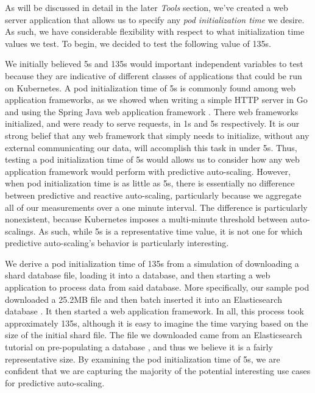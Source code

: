 As will be discussed in detail in the later \textit{Tools} section, we've created a web
server application that allows us to specify any \textit{pod
initialization time} we desire. As such, we have considerable flexibility with
respect to what initialization time values we test. To begin, we decided to test the
following value of 135s.

We initially believed 5s and 135s would important independent variables to test because they
are indicative of different classes of applications that could be run on
Kubernetes. A pod initialization time of 5s is commonly found among web
application frameworks, as we showed when writing a simple HTTP server in Go and
using the Spring Java web application framework \cite{spring}. There web
frameworks initialized, and were ready to serve requests, in 1s and 5s
respectively. It is our strong belief that any web framework that simply
needs to initialize, without any external communicating our data, will
accomplish this task in under 5s. Thus, testing a pod initialization time of 5s
would allows us to consider how any web application framework would perform with
predictive auto-scaling. However, when pod initialization time is as little as
5s, there is essentially no difference between predictive and reactive
auto-scaling, particularly because we aggregate all of our measurements over a
one minute interval. The difference is particularly nonexistent, because
Kubernetes imposes a multi-minute threshold between auto-scalings.
As such, while 5s is a representative time value, it is not
one for which predictive auto-scaling's behavior is particularly interesting.

We derive a pod initialization time of 135s from a simulation of downloading a
shard database file, loading it into a database, and then starting a web
application to process data from said database. More specifically, our sample
pod downloaded a 25.2MB file and then batch inserted it into an Elasticsearch
database \cite{elasticsearch}. It then started a web application framework. In
all, this process took approximately 135s, although it is easy to imagine the
time varying based on the size of the initial shard file. The file we downloaded
came from an Elasticsearch tutorial on pre-populating a database
\cite{elasticsearch-import-some-data}, and thus we believe it is a fairly
representative size. By examining the pod initialization time of 5s, we
are confident that we are capturing the majority of the potential interesting use cases for
predictive auto-scaling.

